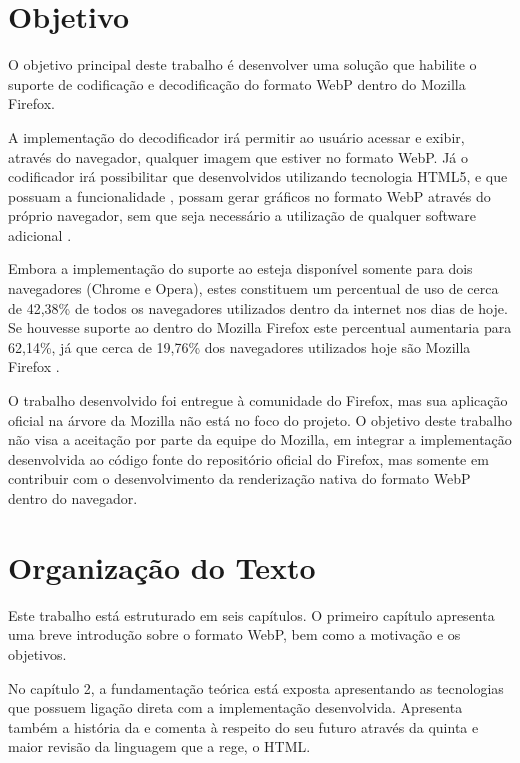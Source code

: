 \documentclass[espaco=simples,appendix=Name]{abnt}
\begin{document}
\section{Objetivo}

O objetivo principal deste trabalho é desenvolver uma solução que habilite o suporte de codificação e decodificação do formato WebP dentro do Mozilla Firefox. 

A implementação do decodificador irá permitir ao usuário acessar e exibir, através do navegador, qualquer imagem que estiver no formato WebP. Já o codificador irá possibilitar que  desenvolvidos utilizando tecnologia HTML5, e que possuam a funcionalidade , possam gerar gráficos no formato WebP através do próprio navegador, sem que seja necessário a utilização de qualquer software adicional \cite{pfeiffer2010definitive}.

Embora a implementação do suporte ao  esteja disponível somente para dois navegadores (Chrome e Opera), estes constituem um percentual de uso de cerca de 42,38\% de todos os navegadores utilizados dentro da internet nos dias de hoje. Se houvesse suporte ao  dentro do Mozilla Firefox este percentual aumentaria para 62,14\%, já que cerca de 19,76\% dos navegadores utilizados hoje são Mozilla Firefox \cite{BrowserStats}.

O trabalho desenvolvido foi entregue à comunidade do Firefox, mas sua aplicação oficial na árvore da Mozilla não está no foco do projeto. O objetivo deste trabalho não visa a aceitação por parte da equipe do Mozilla, em integrar a implementação desenvolvida ao código fonte do repositório oficial do Firefox, mas somente em contribuir com o desenvolvimento da renderização nativa do formato WebP dentro do navegador.

\section{Organização do Texto}

Este trabalho está estruturado em seis capítulos. O primeiro capítulo apresenta uma breve introdução sobre o formato WebP, bem como a motivação e os objetivos. 

No capítulo 2, a fundamentação teórica está exposta apresentando as tecnologias que possuem ligação direta com a implementação desenvolvida. Apresenta também a história da  e comenta à respeito do seu futuro através da quinta e maior revisão da linguagem que a rege, o HTML. 
\end{document}
